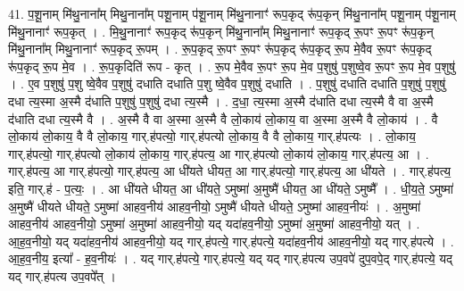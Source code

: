 \documentclass[17pt]{extarticle}
\begin{document}
41. प॒शू॒नाम् मि॑थु॒नाना᳚म् मिथु॒नाना᳚म् पशू॒नाम् प॑शू॒नाम् मि॑थु॒नानाꣳ॑ रूप॒कृद् रू॑प॒कृन् मि॑थु॒नाना᳚म् पशू॒नाम् प॑शू॒नाम् मि॑थु॒नानाꣳ॑ रूप॒कृत् । . मि॒थु॒नानाꣳ॑ रूप॒कृद् रू॑प॒कृन् मि॑थु॒नाना᳚म् मिथु॒नानाꣳ॑ रूप॒कृद् रू॒पꣳ रू॒पꣳ रू॑प॒कृन् मि॑थु॒नाना᳚म् मिथु॒नानाꣳ॑ रूप॒कृद् रू॒पम् । . रू॒प॒कृद् रू॒पꣳ रू॒पꣳ रू॑प॒कृद् रू॑प॒कृद् रू॒प मे॒वैव रू॒पꣳ रू॑प॒कृद् रू॑प॒कृद् रू॒प मे॒व । . रू॒प॒कृदिति॑ रूप - कृत् । . रू॒प मे॒वैव रू॒पꣳ रू॒प मे॒व प॒शुषु॑ प॒शुष्वे॒व रू॒पꣳ रू॒प मे॒व प॒शुषु॑ । . ए॒व प॒शुषु॑ प॒शु ष्वे॒वैव प॒शुषु॑ दधाति दधाति प॒शु ष्वे॒वैव प॒शुषु॑ दधाति । . प॒शुषु॑ दधाति दधाति प॒शुषु॑ प॒शुषु॑ दधा त्य॒स्मा अ॒स्मै द॑धाति प॒शुषु॑ प॒शुषु॑ दधा त्य॒स्मै । . द॒धा॒ त्य॒स्मा अ॒स्मै द॑धाति दधा त्य॒स्मै वै वा अ॒स्मै द॑धाति दधा त्य॒स्मै वै । . अ॒स्मै वै वा अ॒स्मा अ॒स्मै वै लो॒काय॑ लो॒काय॒ वा अ॒स्मा अ॒स्मै वै लो॒काय॑ । . वै लो॒काय॑ लो॒काय॒ वै वै लो॒काय॒ गार्.ह॑पत्यो॒ गार्.ह॑पत्यो लो॒काय॒ वै वै लो॒काय॒ गार्.ह॑पत्यः । . लो॒काय॒ गार्.ह॑पत्यो॒ गार्.ह॑पत्यो लो॒काय॑ लो॒काय॒ गार्.ह॑पत्य॒ आ गार्.ह॑पत्यो लो॒काय॑ लो॒काय॒ गार्.ह॑पत्य॒ आ । . गार्.ह॑पत्य॒ आ गार्.ह॑पत्यो॒ गार्.ह॑पत्य॒ आ धी॑यते धीयत॒ आ गार्.ह॑पत्यो॒ गार्.ह॑पत्य॒ आ धी॑यते । . गार्.ह॑पत्य॒ इति॒ गार्.ह॑ - प॒त्यः॒ । . आ धी॑यते धीयत॒ आ धी॑यते॒ ऽमुष्मा॑ अ॒मुष्मै॑ धीयत॒ आ धी॑यते॒ ऽमुष्मै᳚ । . धी॒य॒ते॒ ऽमुष्मा॑ अ॒मुष्मै॑ धीयते धीयते॒ ऽमुष्मा॑ आहव॒नीय॑ आहव॒नीयो॒ ऽमुष्मै॑ धीयते धीयते॒ ऽमुष्मा॑ आहव॒नीयः॑ । . अ॒मुष्मा॑ आहव॒नीय॑ आहव॒नीयो॒ ऽमुष्मा॑ अ॒मुष्मा॑ आहव॒नीयो॒ यद् यदा॑हव॒नीयो॒ ऽमुष्मा॑ अ॒मुष्मा॑ आहव॒नीयो॒ यत् । . आ॒ह॒व॒नीयो॒ यद् यदा॑हव॒नीय॑ आहव॒नीयो॒ यद् गार्.ह॑पत्ये॒ गार्.ह॑पत्ये॒ यदा॑हव॒नीय॑ आहव॒नीयो॒ यद् गार्.ह॑पत्ये । . आ॒ह॒व॒नीय॒ इत्या᳚ - ह॒व॒नीयः॑ । . यद् गार्.ह॑पत्ये॒ गार्.ह॑पत्ये॒ यद् यद् गार्.ह॑पत्य उप॒वपे॑ दुप॒वपे॒द् गार्.ह॑पत्ये॒ यद् यद् गार्.ह॑पत्य उप॒वपे᳚त् । \newline
\end{document}

